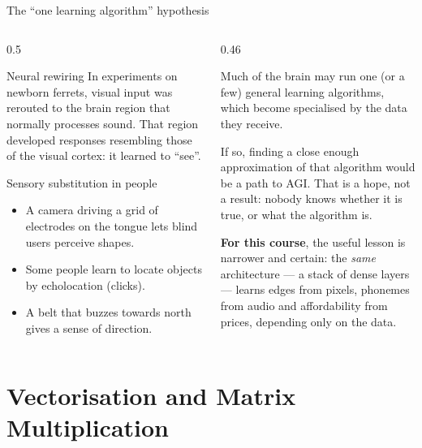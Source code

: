 \documentclass[aspectratio=169,10pt]{beamer}
\begin{document}
\begin{frame}{The ``one learning algorithm'' hypothesis}
  \begin{columns}[T,onlytextwidth]
    \begin{column}{0.5\textwidth}
      \begin{block}{Neural rewiring}
        \footnotesize
        In experiments on newborn ferrets, visual input was rerouted to the brain region that
        normally processes sound. That region developed responses resembling those of the
        visual cortex: it learned to ``see''.
      \end{block}
      \begin{block}{Sensory substitution in people}
        \footnotesize
        \begin{itemize}
          \item A camera driving a grid of electrodes on the tongue lets blind users perceive
                shapes.
          \item Some people learn to locate objects by echolocation (clicks).
          \item A belt that buzzes towards north gives a sense of direction.
        \end{itemize}
      \end{block}
    \end{column}
    \begin{column}{0.46\textwidth}
      \begin{keyidea}
        Much of the brain may run one (or a few) general learning algorithms, which become
        specialised by the data they receive.
      \end{keyidea}
      \footnotesize
      If so, finding a close enough approximation of that algorithm would be a path to
      AGI. That is a hope, not a result: nobody knows whether it is true, or what the
      algorithm is.\par
      \vspace{2mm}
      \textbf{For this course}, the useful lesson is narrower and certain: the \emph{same}
      architecture --- a stack of dense layers --- learns edges from pixels, phonemes from
      audio and affordability from prices, depending only on the data.
    \end{column}
  \end{columns}
\end{frame}

\section{Vectorisation and Matrix Multiplication}
\end{document}
